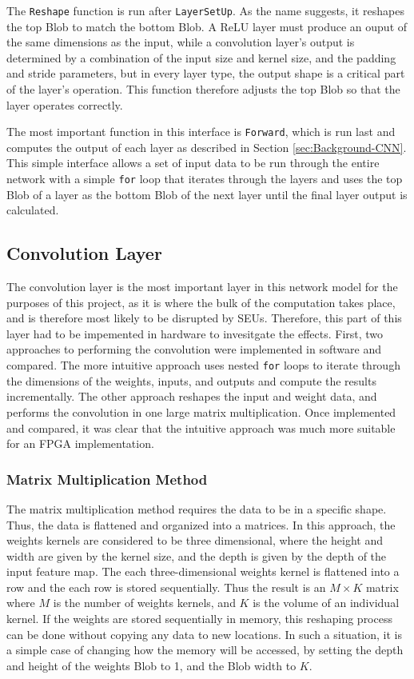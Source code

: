 \documentclass[12pt]{article}
\begin{document}
The \lstinline|Reshape| function is run after \lstinline|LayerSetUp|. As the name suggests, it reshapes the top Blob to match the bottom Blob. A ReLU layer must produce an ouput of the same dimensions as the input, while a convolution layer's output is determined by a combination of the input size and kernel size, and the padding and stride parameters, but in every layer type, the output shape is a critical part of the layer's operation. This function therefore adjusts the top Blob so that the layer operates correctly.

The most important function in this interface is \lstinline|Forward|, which is run last and computes the output of each layer as described in Section \ref{sec:Background-CNN}. This simple interface allows a set of input data to be run through the entire network with a simple \lstinline|for| loop that iterates through the layers and uses the top Blob of a layer as the bottom Blob of the next layer until the final layer output is calculated.

\subsection{Convolution Layer}
\label{sec:Design-Conv}

The convolution layer is the most important layer in this network model for the purposes of this project, as it is where the bulk of the computation takes place, and is therefore most likely to be disrupted by SEUs. Therefore, this part of this layer had to be impemented in hardware to invesitgate the effects. First, two approaches to performing the convolution were implemented in software and compared. The more intuitive approach uses nested \lstinline|for| loops to iterate through the dimensions of the weights, inputs, and outputs and compute the results incrementally. The other approach reshapes the input and weight data, and performs the convolution in one large matrix multiplication. Once implemented and compared, it was clear that the intuitive approach was much more suitable for an FPGA implementation.

\subsubsection{Matrix Multiplication Method}
\label{sec:Design-Conv-MM}

The matrix multiplication method requires the data to be in a specific shape. Thus, the data is flattened and organized into a matrices. In this approach, the weights kernels are considered to be three dimensional, where the height and width are given by the kernel size, and the depth is given by the depth of the input feature map. The each three-dimensional weights kernel is flattened into a row and the each row is stored sequentially. Thus the result is an $M \times K$ matrix where $M$ is the number of weights kernels, and $K$ is the volume of an individual kernel. If the weights are stored sequentially in memory, this reshaping process can be done without copying any data to new locations. In such a situation, it is a simple case of changing how the memory will be accessed, by setting the depth and height of the weights Blob to 1, and the Blob width to $K$.
\end{document}
